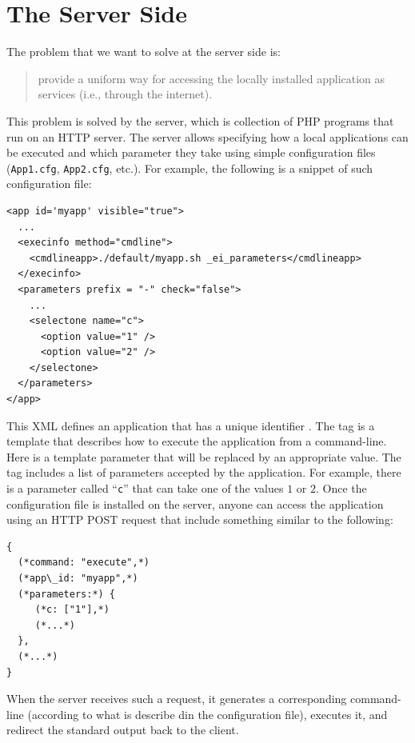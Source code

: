 \section{The Server Side}
\label{ch:overview:arch:server}

The problem that we want to solve at the server side is: 
%
\begin{quote}
  provide a uniform way for accessing the locally installed
  application as services (i.e., through the internet).
\end{quote}
%
This problem is solved by the \ei server, which is collection of PHP
programs that run on an HTTP server. The \ei server allows specifying
how a local applications can be executed and which parameter they take
using simple configuration files (\texttt{App1.cfg},
\texttt{App2.cfg}, etc.). For example, the following is a snippet of
such configuration file:

\medskip
\begin{lstlisting}
<app id='myapp' visible="true">
  ...
  <execinfo method="cmdline">
    <cmdlineapp>./default/myapp.sh _ei_parameters</cmdlineapp>
  </execinfo>
  <parameters prefix = "-" check="false">
    ...
    <selectone name="c">
      <option value="1" />
      <option value="2" />
    </selectone>
  </parameters>
</app>
\end{lstlisting}

\medskip
\noindent
This XML defines an application that has a unique identifier
.  The  tag is a template that describes
how to execute the application from a command-line. Here
 is a template parameter that will be replaced by
an appropriate value. The  tag includes a list of
parameters accepted by the application. For example, there is a
parameter called ``\texttt{c}'' that can take one of the values $1$ or
$2$.
%
Once the configuration file is installed on the \ei server, anyone can
access the application using an HTTP POST request that include
something similar to the following:

\medskip
\begin{lstlisting}
{
  (*command: "execute",*)
  (*app\_id: "myapp",*)
  (*parameters:*) {
     (*c: ["1"],*)
     (*...*)
  },
  (*...*)
}
\end{lstlisting} 

\medskip
\noindent
When the \ei server receives such a request, it generates a
corresponding command-line (according to what is describe din the
configuration file), executes it, and redirect the standard output
back to the client.

